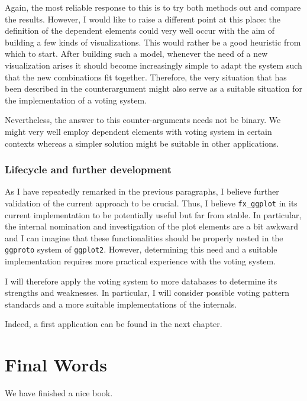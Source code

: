 \documentclass[]{report}
\theoremstyle{definition}
\theoremstyle{definition}
\theoremstyle{definition}
\theoremstyle{remark}
\begin{document}
Again, the most reliable response to this is to try both methods out and
compare the results. However, I would like to raise a different point at
this place: the definition of the dependent elements could very well
occur with the aim of building a few kinds of visualizations. This would
rather be a good heuristic from which to start. After building such a
model, whenever the need of a new visualization arises it should become
increasingly simple to adapt the system such that the new combinations
fit together. Therefore, the very situation that has been described in
the counterargument might also serve as a suitable situation for the
implementation of a voting system.

Nevertheless, the answer to this counter-arguments needs not be binary.
We might very well employ dependent elements with voting system in
certain contexts whereas a simpler solution might be suitable in other
applications.

\subsection{Lifecycle and further
development}\label{lifecycle-and-further-development}

As I have repeatedly remarked in the previous paragraphs, I believe
further validation of the current approach to be crucial. Thus, I
believe \texttt{fx\_ggplot} in its current implementation to be
potentially useful but far from stable. In particular, the internal
nomination and investigation of the plot elements are a bit awkward and
I can imagine that these functionalities should be properly nested in
the \texttt{ggproto} system of \texttt{ggplot2}. However, determining
this need and a suitable implementation requires more practical
experience with the voting system.

I will therefore apply the voting system to more databases to determine
its strengths and weaknesses. In particular, I will consider possible
voting pattern standards and a more suitable implementations of the
internals.

Indeed, a first application can be found in the next chapter.

\chapter{Final Words}\label{final-words}

We have finished a nice book.


\end{document}
